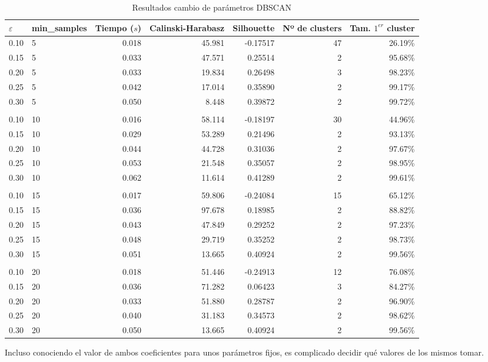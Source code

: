 \documentclass[a4paper, 20pt]{article}
\begin{document}
\begin{table}[H]
\centering
\caption{Resultados cambio de parámetros DBSCAN}
\label{tab:param_dbscan2}
\begin{tabular}{llrrrrr}
\toprule
$\varepsilon$ & min\_samples & Tiempo ($s$) & Calinski-Harabasz & Silhouette & Nº de clusters & Tam. $1^{er}$ cluster\\
\midrule
0.10 & 5 & 0.018 & 45.981 & -0.17517 & 47 & 26.19\% \\
0.15 & 5 & 0.033 & 47.571 & 0.25514 & 2 & 95.68\% \\
0.20 & 5 & 0.033 & 19.834 & 0.26498 & 3 & 98.23\% \\
0.25 & 5 & 0.042 & 17.014 & 0.35890 & 2 & 99.17\% \\
0.30 & 5 & 0.050 & 8.448 & 0.39872 & 2 & 99.72\% \\
\\
0.10 & 10 & 0.016 & 58.114 & -0.18197 & 30 & 44.96\% \\
0.15 & 10 & 0.029 & 53.289 & 0.21496 & 2 & 93.13\% \\
0.20 & 10 & 0.044 & 44.728 & 0.31036 & 2 & 97.67\% \\
0.25 & 10 & 0.053 & 21.548 & 0.35057 & 2 & 98.95\% \\
0.30 & 10 & 0.062 & 11.614 & 0.41289 & 2 & 99.61\% \\
\\
0.10 & 15 & 0.017 & 59.806 & -0.24084 & 15 & 65.12\% \\
0.15 & 15 & 0.036 & 97.678 & 0.18985 & 2 & 88.82\% \\
0.20 & 15 & 0.043 & 47.849 & 0.29252 & 2 & 97.23\% \\
0.25 & 15 & 0.048 & 29.719 & 0.35252 & 2 & 98.73\% \\
0.30 & 15 & 0.051 & 13.665 & 0.40924 & 2 & 99.56\% \\
\\
0.10 & 20 & 0.018 & 51.446 & -0.24913 & 12 & 76.08\% \\
0.15 & 20 & 0.036 & 71.282 & 0.06423 & 3 & 84.27\% \\
0.20 & 20 & 0.033 & 51.880 & 0.28787 & 2 & 96.90\% \\
0.25 & 20 & 0.040 & 31.183 & 0.34573 & 2 & 98.62\% \\
0.30 & 20 & 0.050 & 13.665 & 0.40924 & 2 & 99.56\% \\
\bottomrule
\end{tabular}
\end{table}


Incluso conociendo el valor de ambos coeficientes para unos parámetros fijos, es complicado decidir qué valores de los mismos tomar.
\end{document}
